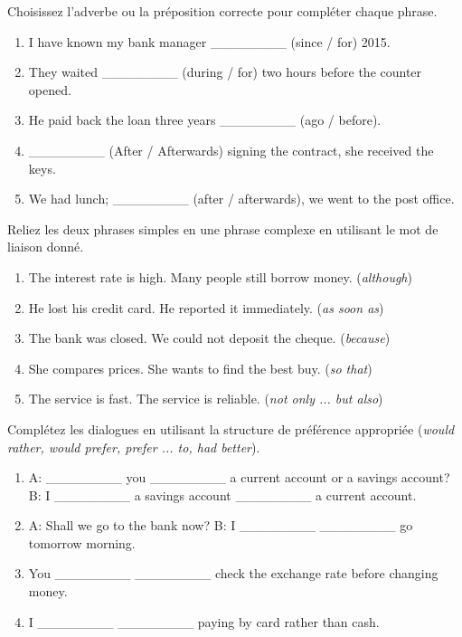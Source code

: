 \documentclass[11pt]{article}
\begin{document}
\begin{exercice}
Choisissez l'adverbe ou la préposition correcte pour compléter chaque phrase.
\begin{enumerate}
    \item I have known my bank manager \_\_\_\_\_\_\_\_ (since / for) 2015.
    \item They waited \_\_\_\_\_\_\_\_ (during / for) two hours before the counter opened.
    \item He paid back the loan three years \_\_\_\_\_\_\_\_ (ago / before).
    \item \_\_\_\_\_\_\_\_ (After / Afterwards) signing the contract, she received the keys.
    \item We had lunch; \_\_\_\_\_\_\_\_ (after / afterwards), we went to the post office.
\end{enumerate}
\end{exercice}

\begin{exercice}
Reliez les deux phrases simples en une phrase complexe en utilisant le mot de liaison donné.
\begin{enumerate}
    \item The interest rate is high. Many people still borrow money. (\textit{although})
    \item He lost his credit card. He reported it immediately. (\textit{as soon as})
    \item The bank was closed. We could not deposit the cheque. (\textit{because})
    \item She compares prices. She wants to find the best buy. (\textit{so that})
    \item The service is fast. The service is reliable. (\textit{not only ... but also})
\end{enumerate}
\end{exercice}

\begin{exercice}
Complétez les dialogues en utilisant la structure de préférence appropriée (\textit{would rather, would prefer, prefer ... to, had better}).
\begin{enumerate}
    \item A: \_\_\_\_\_\_\_\_ you \_\_\_\_\_\_\_\_ a current account or a savings account?
    B: I \_\_\_\_\_\_\_\_ a savings account \_\_\_\_\_\_\_\_ a current account.
    \item A: Shall we go to the bank now?
    B: I \_\_\_\_\_\_\_\_ \_\_\_\_\_\_\_\_ go tomorrow morning.
    \item You \_\_\_\_\_\_\_\_ \_\_\_\_\_\_\_\_ check the exchange rate before changing money.
    \item I \_\_\_\_\_\_\_\_ \_\_\_\_\_\_\_\_ paying by card rather than cash.
\end{enumerate}
\end{exercice}
\end{document}
